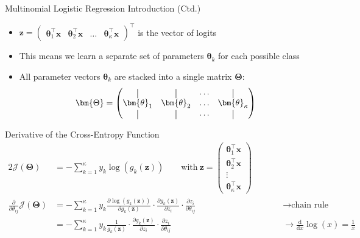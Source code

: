 \begin{frame}{Multinomial Logistic Regression Introduction (Ctd.)}{}\optional
	\begin{itemize}
		\item $\bm{z} = \begin{pmatrix}
			\bm{\theta}_{1}^{\intercal} \bm{x} &
			\bm{\theta}_{2}^{\intercal} \bm{x} &
			\hdots &
			\bm{\theta}_{\kappa}^{\intercal} \bm{x}
		\end{pmatrix}^{\intercal}$ is the vector of logits
		\item This means we learn a separate set of parameters $\bm{\theta}_k$ for each possible class
		\item All parameter vectors $\bm{\theta}_k$ are stacked into a single matrix $\bm{\Theta}$:
		\begin{equation}
			\bm{\Theta} = \begin{pmatrix}
				\vertbar 			& \vertbar			& \hdots 			& \vertbar 				\\
				\bm{\theta}_1 		& \bm{\theta}_2 	& \hdots 			& \bm{\theta}_{\kappa}	\\
				\vertbar 			& \vertbar			& \hdots 			& \vertbar
			\end{pmatrix}
		\end{equation}
	\end{itemize}
\end{frame}


\begin{frame}{Derivative of the Cross-Entropy Function}{}\optional
	\footnotesize
	\begin{alignat*}{2}
		\mathcal{J}(\bm{\Theta})
			&= 	-\sum_{k=1}^{\kappa} y_k \log(g_k(\bm{z})) \qquad \text{with}\ \bm{z} =
				\begin{pmatrix}
					\bm{\theta}_{1}^{\intercal} \bm{x} \\
					\bm{\theta}_{2}^{\intercal} \bm{x} \\
					\vdots \\
					\bm{\theta}_{\kappa}^{\intercal} \bm{x}
				\end{pmatrix} 																				\\[4mm]
		\frac{\partial}{\partial \theta_{ij}} \mathcal{J}(\bm{\Theta})
			&= 	-\sum_{k=1}^{\kappa} y_k \frac{\partial \log(g_k(\bm{z}))}{\partial g_k(\bm{z})} \cdot
				\frac{\partial g_k(\bm{z})}{\partial z_i} \cdot \frac{\partial z_i}{\partial \theta_{ij}}
			&&	\qquad\longrightarrow \text{chain rule} 															\\[2mm]
			&= 	-\sum_{k=1}^{\kappa} y_k \frac{1}{g_k(\bm{z})} \cdot \frac{\partial g_k(\bm{z})}{\partial z_i} \cdot
				\frac{\partial z_i}{\partial \theta_{ij}}
			&&	\qquad\longrightarrow \frac{\text{d}}{\text{d}x} \log(x) = \frac{1}{x}
	\end{alignat*}
\end{frame}


